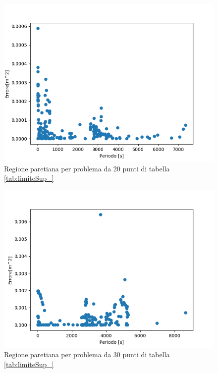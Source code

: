 \documentclass[a4paper,12pt]{report}
\begin{document}
\begin{itemize}
  \begin{figure}[H]
    \centering
    \includegraphics[scale=0.70]{img/puls0013/puntoUtopia20.png}
    \caption{Regione paretiana per problema da 20 punti di tabella \ref{tab:limiteSup_}}
    \label{fig:reg_ammis_20_0013}
  \end{figure}

  \begin{figure}[H]
    \centering
    \includegraphics[scale=0.70]{img/puls0013/puntoUtopia30.png}
    \caption{Regione paretiana per problema da 30 punti di tabella \ref{tab:limiteSup_}}
    \label{fig:reg_ammis_30_0013}
  \end{figure}



\end{itemize}
\end{document}
